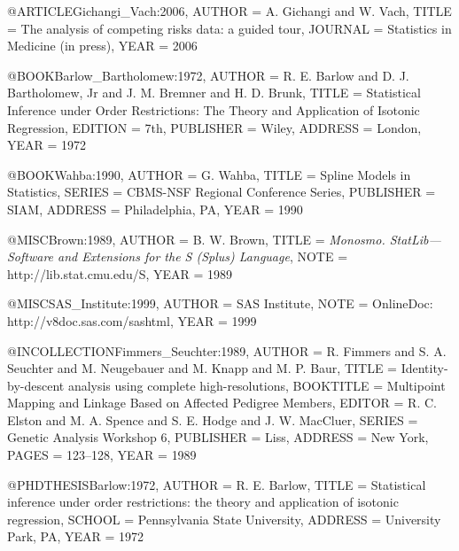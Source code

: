 

@ARTICLE{Gichangi_Vach:2006,
  AUTHOR =       {A. Gichangi and W. Vach},
  TITLE =        {The analysis of competing risks data: a guided tour},
  JOURNAL =      {Statistics in Medicine {\rm (in press)}},
  YEAR =         {2006}
}


@BOOK{Barlow_Bartholomew:1972,
  AUTHOR =       {R. E. Barlow and D. J. {Bartholomew, Jr} and J. M. Bremner and H. D. Brunk},
  TITLE =        {Statistical Inference under Order Restrictions: The Theory and Application of Isotonic Regression},
  EDITION =      {7th},
  PUBLISHER =    {Wiley},
  ADDRESS =      {London},
  YEAR =         {1972}
}

@BOOK{Wahba:1990,
  AUTHOR =       {G. Wahba},
  TITLE =        {Spline Models in Statistics},
  SERIES =       {CBMS-NSF Regional Conference Series},
  PUBLISHER =    {SIAM},
  ADDRESS =      {Philadelphia, PA},
  YEAR =         {1990}
}


@MISC{Brown:1989,
  AUTHOR =       {B. W. Brown},
  TITLE =        {\emph{Monosmo. StatLib---Software and Extensions for the S (Splus) Language}},
  NOTE =         {http://lib.stat.cmu.edu/S},
  YEAR =         {1989}
}

@MISC{SAS_Institute:1999,
  AUTHOR =       {{SAS Institute}},
  NOTE =         {OnlineDoc: http://v8doc.sas.com/sashtml},
  YEAR =         {1999}
}


@INCOLLECTION{Fimmers_Seuchter:1989,
  AUTHOR =       {R. Fimmers and S. A. Seuchter and M. Neugebauer and M. Knapp and M. P. Baur},
  TITLE =        {Identity-by-descent analysis using complete high-resolutions},
  BOOKTITLE =    {Multipoint Mapping and Linkage Based on Affected Pedigree Members},
  EDITOR =       {R. C. Elston and M. A. Spence and S. E. Hodge and J. W. MacCluer},
  SERIES =       {Genetic Analysis Workshop 6},
  PUBLISHER =    {Liss},
  ADDRESS =      {New York},
  PAGES =        {123--128},
  YEAR =         {1989}
}


@PHDTHESIS{Barlow:1972,
  AUTHOR =       {R. E. Barlow},
  TITLE =        {Statistical inference under order restrictions: the theory and application of isotonic regression},
  SCHOOL =       {Pennsylvania State University},
  ADDRESS =      {University Park, PA},
  YEAR =         {1972}
}

